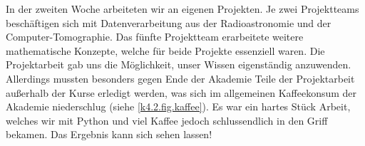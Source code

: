 In der zweiten Woche arbeiteten wir an eigenen Projekten.
Je zwei Projektteams beschäftigen sich mit Datenverarbeitung aus der Radioastronomie und der Computer-Tomographie.
Das fünfte Projektteam erarbeitete weitere mathematische Konzepte, welche für beide Projekte essenziell waren.
Die Projektarbeit gab uns die Möglichkeit, unser Wissen eigenständig anzuwenden.
Allerdings mussten besonders gegen Ende der Akademie Teile der Projektarbeit außerhalb der Kurse erledigt werden, was sich im allgemeinen Kaffeekonsum der Akademie niederschlug (siehe \cref{k4.2.fig.kaffee}).
Es war ein hartes Stück Arbeit, welches wir mit Python und viel Kaffee jedoch schlussendlich in den Griff bekamen.
Das Ergebnis kann sich sehen lassen!

